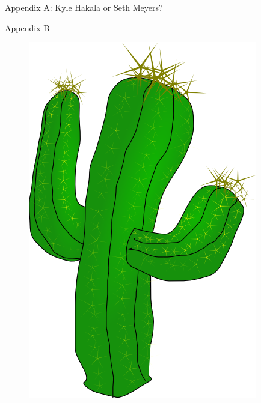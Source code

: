 \documentclass[xcolor=dvipsnames,aspectratio=1610]{beamer}
\begin{document}
\begin{frame}{Appendix A: Kyle Hakala or Seth Meyers?}
\begin{figure}
\begin{minipage}{.5\textwidth}
      \end{minipage}
      \end{figure}

  \end{frame}

  \begin{frame}{Appendix B}
      \begin{figure}
        \includegraphics[scale=0.6]{cactus.png}
      \end{figure}
  \end{frame}
\end{document}
